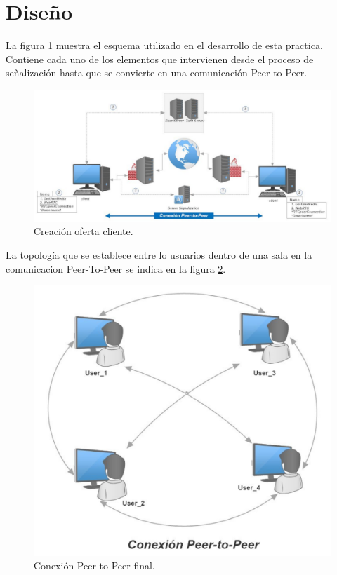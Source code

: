 \section{Diseño}
La figura \ref{fig:ComunnicacionWebRTC} muestra el esquema utilizado en el desarrollo de esta practica. Contiene cada uno de los elementos que intervienen desde el proceso de señalización hasta que se convierte en una comunicación Peer-to-Peer.
\begin{figure}[!h]
\centering
\includegraphics[width=0.9\linewidth]{Figures/ComunnicacionWebRTC}
\decoRule
\caption[Creación oferta cliente.]{Creación oferta cliente.}
\label{fig:ComunnicacionWebRTC}
\end{figure}

La topología que se establece entre lo usuarios dentro de una sala en la comunicacion Peer-To-Peer se  indica en la figura \ref{fig:Coneccion_finish}.
\begin{figure}[!h]
\centering
\includegraphics[width=0.3\linewidth]{Figures/Conexcion_finish}
\decoRule
\caption[Conexión Peer-to-Peer final.]{Conexión Peer-to-Peer final.}
\label{fig:Coneccion_finish}
\end{figure}


